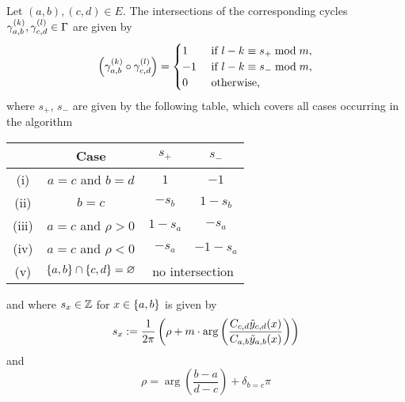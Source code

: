 \documentclass[main.tex]{subfiles}
\begin{document}
   \begin{thm}\label{thm:intsec_numb}
      Let $(a,b),(c,d) \in E$. The intersections of the corresponding cycles $\gamma_{a,b}^{(k)}, \gamma_{c,d}^{(l)} \in \Gamma$ are given by
      \begin{equation}
          \left(\gamma_{a,b}^{(k)} \circ \gamma_{c,d}^{(l)}\right)
          = \begin{cases}
              1  &\text{ if } l-k \equiv s_+ \bmod m,\\
              -1 &\text{ if } l-k \equiv s_- \bmod m,\\
              0 &\text{ otherwise,}
          \end{cases}
      \end{equation}
      where $s_+$, $s_-$ are given by the following table, which covers all
      cases occurring in the algorithm
      \begin{center}
      \begin{tabular}{cccc}
          \toprule
          & Case & $s_+$ & $s_-$ \\
          \midrule
         (i) & $a=c$ and $b=d$ & $1$ & $-1$ \\
         (ii) & $b=c$ & $-s_b$ & $1-s_b$ \\
         (iii) & $a=c$ and $\rho>0$ & $1-s_a$ & $-s_a$ \\
         (iv) & $a=c$ and $\rho<0$ & $-s_a$ & $-1-s_a$\\
         (v) & $\left\{a,b\right\}\cap\left\{c,d\right\}=\varnothing$ & \multicolumn{2}{c}{no intersection} \\
          \bottomrule
      \end{tabular}
      \end{center}
      and where $s_x \in \mathbb{Z}$ for $x\in\left\{a,b\right\}$ is given by
      \begin{equation}\label{eq:s_x}
	    s_x := \frac{1}{2\pi}\left( \rho + m \cdot \arg \left( \frac{C_{c,d} \tilde{y}_{c,d}(x)}{C_{a,b}\tilde{y}_{a,b}(x)} \right) 
	    \right)
      \end{equation}
     and
      \begin{equation}
          \rho = \arg \left( \frac{b-a}{d-c} \right) + \delta_{b=c}\pi
      \end{equation}
 \end{thm}
 
\end{document}
